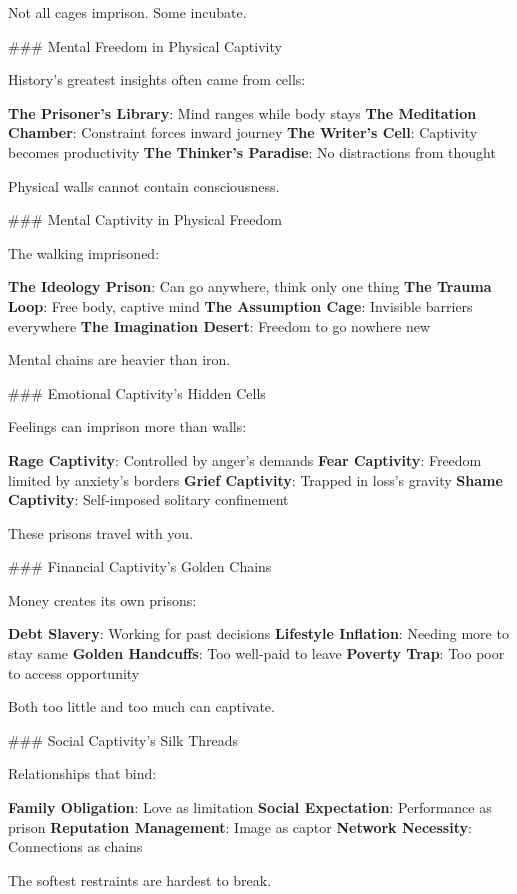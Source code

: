 \documentclass[12pt]{book}
\begin{document}
Not all cages imprison. Some incubate.

\#\#\# Mental Freedom in Physical Captivity

History's greatest insights often came from cells:

\textbf{The Prisoner's Library}: Mind ranges while body stays
\textbf{The Meditation Chamber}: Constraint forces inward journey
\textbf{The Writer's Cell}: Captivity becomes productivity
\textbf{The Thinker's Paradise}: No distractions from thought

Physical walls cannot contain consciousness.

\#\#\# Mental Captivity in Physical Freedom

The walking imprisoned:

\textbf{The Ideology Prison}: Can go anywhere, think only one thing
\textbf{The Trauma Loop}: Free body, captive mind
\textbf{The Assumption Cage}: Invisible barriers everywhere
\textbf{The Imagination Desert}: Freedom to go nowhere new

Mental chains are heavier than iron.

\#\#\# Emotional Captivity's Hidden Cells

Feelings can imprison more than walls:

\textbf{Rage Captivity}: Controlled by anger's demands
\textbf{Fear Captivity}: Freedom limited by anxiety's borders
\textbf{Grief Captivity}: Trapped in loss's gravity
\textbf{Shame Captivity}: Self-imposed solitary confinement

These prisons travel with you.

\#\#\# Financial Captivity's Golden Chains

Money creates its own prisons:

\textbf{Debt Slavery}: Working for past decisions
\textbf{Lifestyle Inflation}: Needing more to stay same
\textbf{Golden Handcuffs}: Too well-paid to leave
\textbf{Poverty Trap}: Too poor to access opportunity

Both too little and too much can captivate.

\#\#\# Social Captivity's Silk Threads

Relationships that bind:

\textbf{Family Obligation}: Love as limitation
\textbf{Social Expectation}: Performance as prison
\textbf{Reputation Management}: Image as captor
\textbf{Network Necessity}: Connections as chains

The softest restraints are hardest to break.
\end{document}
